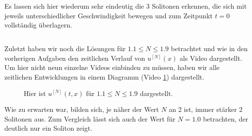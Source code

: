 \documentclass[ngerman]{scrartcl}
\begin{document}
Es lassen sich hier wiederum sehr eindeutig die 3 Solitonen erkennen, die sich mit jeweils unterschiedlicher Geschwindigkeit bewegen und zum Zeitpunkt $t=0$ vollständig überlagern.




\subsection{}

Zuletzt haben wir noch die Lösungen für $1.1 \le N \le 1.9$ betrachtet und wie in den vorherigen Aufgaben den zeitlichen Verlauf von $u^{[N]}(x)$ als Video dargestellt. Um hier nicht neun einzelne Videos einbinden zu müssen, haben wir alle zeitlichen Entwicklungen in einem Diagramm (Video \ref{vid:H10.4}) dargestellt.

\begin{figure}[htbp]
	\centering
	\caption[]{Hier ist $u^{[N]}(t, x)$ für $1.1 \le N \le 1.9$ dargestellt.}
	\label{vid:H10.4}
\end{figure}


Wie zu erwarten war, bilden sich, je näher der Wert $N$ an 2 ist, immer stärker 2 Solitonen aus. Zum Vergleich lässt sich auch der Wert für $N=1.0$ betrachten, der deutlich nur ein Soliton zeigt.
\end{document}
